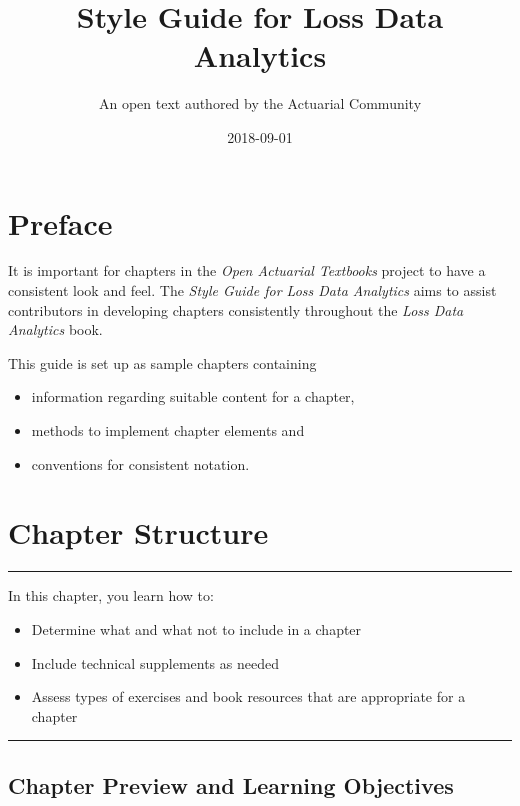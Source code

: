 \documentclass[]{book}
\title{Style Guide for Loss Data Analytics}
\author{An open text authored by the Actuarial Community}
\date{2018-09-01}
\providecommand{\tightlist}{%
  \setlength{\itemsep}{0pt}\setlength{\parskip}{0pt}}
\theoremstyle{definition}
\theoremstyle{definition}
\theoremstyle{definition}
\theoremstyle{remark}
\begin{document}
\maketitle

{
\setcounter{tocdepth}{1}
\tableofcontents
}
\chapter*{Preface}\label{preface}

It is important for chapters in the \emph{Open Actuarial Textbooks}
project to have a consistent look and feel. The \emph{Style Guide for
Loss Data Analytics} aims to assist contributors in developing chapters
consistently throughout the \emph{Loss Data Analytics} book.

This guide is set up as sample chapters containing

\begin{itemize}
\tightlist
\item
  information regarding suitable content for a chapter,
\item
  methods to implement chapter elements and
\item
  conventions for consistent notation.
\end{itemize}

\chapter{Chapter Structure}\label{chapter-structure}

\begin{center}\rule{0.5\linewidth}{\linethickness}\end{center}

In this chapter, you learn how to:

\begin{itemize}
\tightlist
\item
  Determine what and what not to include in a chapter
\item
  Include technical supplements as needed
\item
  Assess types of exercises and book resources that are appropriate for
  a chapter
\end{itemize}

\begin{center}\rule{0.5\linewidth}{\linethickness}\end{center}

\section{Chapter Preview and Learning
Objectives}\label{chapter-preview-and-learning-objectives}
\end{document}
